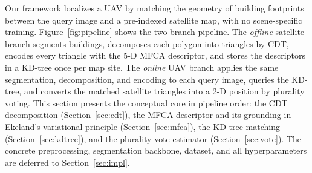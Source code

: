 \documentclass[10pt]{article}
\theoremstyle{plain}
\theoremstyle{definition}
\begin{document}
Our framework localizes a UAV by matching the geometry of building footprints
between the query image and a pre-indexed satellite map, with no scene-specific
training.
Figure~\ref{fig:pipeline} shows the two-branch pipeline.
The \emph{offline} satellite branch segments buildings, decomposes each polygon
into triangles by CDT, encodes every triangle with the 5-D MFCA descriptor, and
stores the descriptors in a KD-tree once per map site.
The \emph{online} UAV branch applies the same segmentation, decomposition, and
encoding to each query image, queries the KD-tree, and converts the matched
satellite triangles into a 2-D position by plurality voting.
This section presents the conceptual core in pipeline order: the CDT
decomposition (Section~\ref{sec:cdt}), the MFCA descriptor and its grounding in
Ekeland's variational principle (Section~\ref{sec:mfca}), the KD-tree matching
(Section~\ref{sec:kdtree}), and the plurality-vote estimator
(Section~\ref{sec:vote}).
The concrete preprocessing, segmentation backbone, dataset, and all
hyperparameters are deferred to Section~\ref{sec:impl}.
\end{document}
